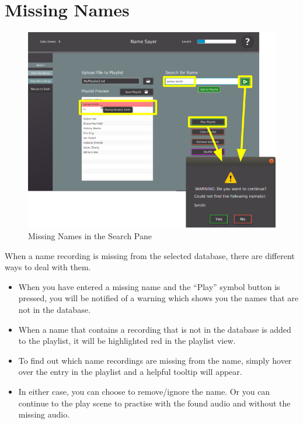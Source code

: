 \documentclass[a4paper,12pt]{article}
\begin{document}
\section{Missing Names}
\begin{figure}[!h]
	\includegraphics[width=\linewidth]{missing.png}
	\caption{Missing Names in the Search Pane}
\end{figure}
When a name recording is missing from the selected database, there are different ways to deal with them.
\begin{itemize}
	\item When you have entered a missing name and the “Play” symbol button is pressed, you will be notified of a warning which shows you the names that are not in the database. 
	
	\item When a name that contains a recording that is not in the database is added to the playlist, it will be highlighted red in the playlist view.
	
	\item To find out which name recordings are missing from the name, simply hover over the entry in the playlist and a helpful tooltip will appear.
	
	\item In either case, you can choose to remove/ignore the name. Or you can continue to the play scene to practise with the found audio and without the missing audio.
\end{itemize}

\newpage
\end{document}
